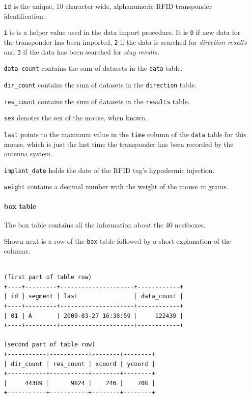 \begin{mydesc}
\item \lstinline|id| is the unique, 10 character wide, alphanumeric RFID transponder identification.
\item \lstinline|i| is is a helper value used in the data import procedure. It is \lstinline|0| if new data for the transponder has been imported, \lstinline|2| if the data is searched for \textit{direction results} and \lstinline|3| if the data has been searched for \textit{stay results}.
\item \lstinline|data_count| contains the sum of datasets in the \lstinline|data| table.
\item \lstinline|dir_count| contains the sum of datasets in the \lstinline|direction| table.
\item \lstinline|res_count| contains the sum of datasets in the \lstinline|results| table.
\item \lstinline|sex| denotes the sex of the mouse, when known.
\item \lstinline|last| points to the maximum value in the \lstinline|time| column of the \lstinline|data| table for this mouse, which is just the last time the transponder has been recorded by the antenna system.
\item \lstinline|implant_date| holds the date of the RFID tag's hypodermic injection.
\item \lstinline|weight| contains a decimal number with the weight of the mouse in grams.
\end{mydesc}

\paragraph{box table}
\label{para:box_table}

The box table contains all the information about the 40 nestboxes. 

Shown next is a row of the \lstinline|box| table followed by a short explanation of the columns.
\codescript
{}
\begin{lstlisting}[frame=none]

(first part of table row)
+----+---------+---------------------+------------+
| id | segment | last                | data_count |
+----+---------+---------------------+------------+
| 01 | A       | 2009-03-27 16:38:59 |     122439 | 
+----+---------+---------------------+------------+

(second part of table row)
+-----------+-----------+--------+--------+
| dir_count | res_count | xcoord | ycoord |
+-----------+-----------+--------+--------+
|     44389 |      9824 |    246 |    708 | 
+-----------+-----------+--------+--------+

\end{lstlisting}

